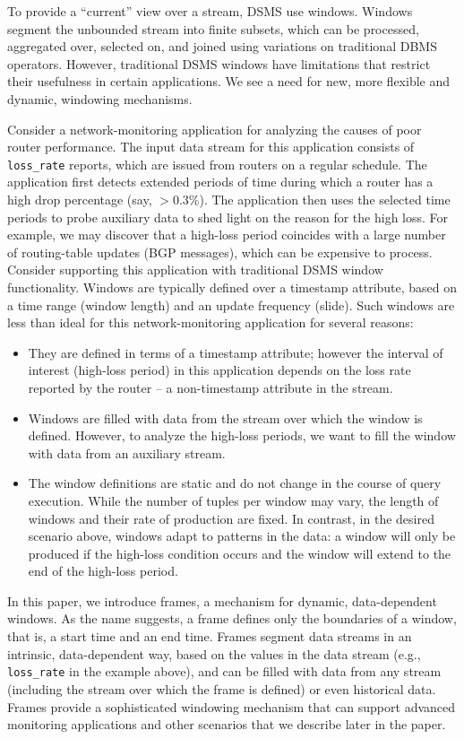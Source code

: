 \documentclass{vldb}
\newcommand{\dquote}[1]{``#1''}
\begin{document}
To provide a \dquote{current} view over a stream, DSMS use windows. Windows segment the unbounded stream into finite subsets, which can be processed, aggregated over, selected on, and joined using variations on traditional DBMS operators. However, traditional DSMS windows have limitations that restrict their usefulness in certain applications. We see a need for new, more flexible and dynamic, windowing mechanisms.

Consider a network-monitoring application for analyzing the causes of poor router performance. The input data stream for this application consists of \texttt{loss\_rate} reports, which are issued from routers on a regular schedule. The application first detects extended periods of time during which a router has a high drop percentage (say, $> 0.3\%$). The application then uses the selected time periods to probe auxiliary data to shed light on the reason for the high loss. For example, we may discover that a high-loss period coincides with a large number of routing-table updates (BGP messages), which can be expensive to process. Consider supporting this application with traditional DSMS window functionality. Windows are typically defined over a timestamp attribute, based on a time range (window length) and an update frequency (slide). Such windows are less than ideal for this network-monitoring application for several reasons:
%
\begin{itemize}
\item They are defined in terms of a timestamp attribute; however the interval of interest (high-loss period) in this application depends on the loss rate reported by the router – a non-timestamp attribute in the stream.
\item Windows are filled with data from the stream over which the window is defined. However, to analyze the high-loss periods, we want to fill the window with data from an auxiliary stream.
\item The window definitions are static and do not change in the course of query execution. While the number of tuples per window may vary, the length of windows and their rate of production are fixed. In contrast, in the desired scenario above, windows adapt to patterns in the data: a window will only be produced if the high-loss condition occurs and the window will extend to the end of the high-loss period.
\end{itemize}

In this paper, we introduce frames, a mechanism for dynamic, data-dependent windows. As the name suggests, a frame defines only the boundaries of a window, that is, a start time and an end time. Frames segment data streams in an intrinsic, data-dependent way, based on the values in the data stream (e.g., \texttt{loss\_rate} in the example above), and can be filled with data from any stream (including the stream over which the frame is defined) or even historical data. Frames provide a sophisticated windowing mechanism that can support advanced monitoring applications and other scenarios that we describe later in the paper.
\end{document}
